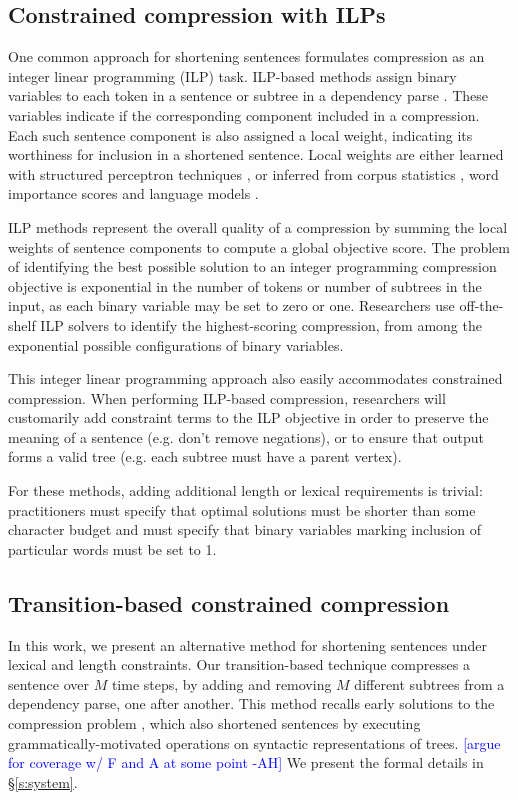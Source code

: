 \documentclass[11pt,a4paper]{article}
\newcommand{\ahcomment}[1]{\textcolor{blue}{[#1 -AH]}}
\begin{document}
\subsection{Constrained compression with ILPs}

One common approach for shortening sentences formulates compression as an integer linear programming (ILP) task. ILP-based methods assign binary variables to each token in a sentence \cite{clarke2008global} or subtree in a dependency parse \cite{filippova2008dependency}. These variables indicate if the corresponding component included in a compression. Each such sentence component is also assigned a local weight, indicating its worthiness for inclusion in a shortened sentence. Local weights are either learned with structured perceptron techniques \cite{filippova2013overcoming}, or inferred from corpus statistics \cite{filippova2008dependency}, word importance scores and language models \cite{clarke2008global}.

ILP methods represent the overall quality of a compression by summing the local weights of sentence components to compute a global objective score.  The problem of identifying the best possible solution to an integer programming compression objective is exponential in the number of tokens or number of subtrees in the input, as each binary variable may be set to zero or one. Researchers use off-the-shelf ILP solvers to identify the highest-scoring compression, from among the exponential possible configurations of binary variables.

This integer linear programming approach also easily accommodates constrained compression. When performing ILP-based compression, researchers will customarily add constraint terms to the ILP objective in order to preserve the meaning of a sentence (e.g. don't remove negations), or to ensure that output forms a valid tree (e.g. each subtree must have a parent vertex).

For these methods, adding additional length or lexical requirements is trivial: practitioners must specify that optimal solutions must be shorter than some character budget and must specify that binary variables marking inclusion of particular words must be set to 1. 

\subsection{Transition-based constrained compression}

In this work, we present an alternative method for shortening sentences under lexical and length constraints. Our transition-based technique compresses a sentence over $M$ time steps, by adding and removing $M$ different subtrees from a dependency parse, one after another. This method recalls early solutions to the compression problem \cite{Jing2000SentenceRF,Knight2000StatisticsBasedS}, which also shortened sentences by executing grammatically-motivated operations on syntactic representations of trees. \ahcomment{argue for coverage w/ F and A at some point} We present the formal details in \S\ref{s:system}.
\end{document}
